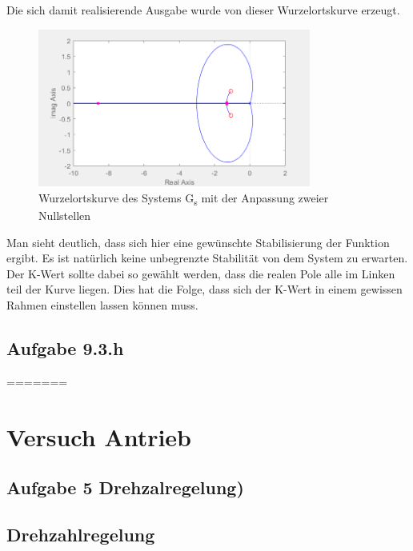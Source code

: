 \documentclass[10pt]{scrartcl}
\begin{document}
Die sich damit realisierende Ausgabe wurde von dieser Wurzelortskurve erzeugt.
\begin{figure}[H]
	\centering
	\includegraphics[width=0.8\textwidth]{WOZ9f3}
	\caption{Wurzelortskurve des Systems G\textsubscript{s} mit der Anpassung zweier Nullstellen}
	\label{img:grafik-dummy}
\end{figure}

Man sieht deutlich, dass sich hier eine gewünschte Stabilisierung der Funktion ergibt. 
Es ist natürlich keine unbegrenzte Stabilität von dem System zu erwarten. 
Der K-Wert sollte dabei so gewählt werden, dass die realen Pole alle im Linken teil der Kurve liegen. 
Dies hat die Folge, dass sich der K-Wert in einem gewissen Rahmen einstellen lassen können muss.


\subsection{Aufgabe 9.3.h}

=======
\section{Versuch Antrieb}
\subsection{Aufgabe 5 Drehzalregelung)}
\subsection{Drehzahlregelung}
\end{document}
